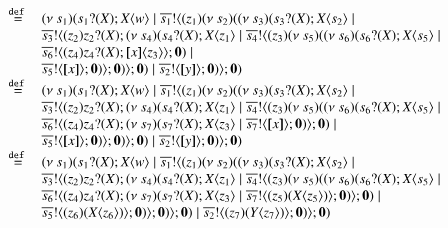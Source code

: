 \[\begin{array}{ll}
	\defeq&
	\newsp{s_1}{ \binp{s_1}{X} \appl{X}{w} \Par \bout{\dual{s_1}}{\abs{z_1}{\newsp{s_2}{\newsp{s_3}{ \binp{s_3}{X} \appl{X}{s_2} \Par \\
	& \bout{\dual{s_3}}{\abs{z_2}{\binp{z_2}{X} \newsp{s_4}{ \binp{s_4}{X} \appl{X}{z_1} \Par \bout{\dual{s_4}}{\abs{z_3}{\newsp{s_5}{ \newsp{s_6}{ \binp{s_6}{X} \appl{X}{s_5} \Par \\
	& \bout{\dual{s_6}}{\abs{z_4}{\binp{z_4}{X} \appl{\map{x}}{z_3}}} \inact} \Par\\
	&\bout{\dual{s_5}}{\map{x}} \inact }}} \inact}}} \inact} \Par \bout{\dual{s_2}}{\map{y}}\inact }}} \inact}\\
	\defeq &
	\newsp{s_1}{ \binp{s_1}{X} \appl{X}{w} \Par \bout{\dual{s_1}}{\abs{z_1}{\newsp{s_2}{\newsp{s_3}{ \binp{s_3}{X} \appl{X}{s_2} \Par \\
	& \bout{\dual{s_3}}{\abs{z_2}{\binp{z_2}{X} \newsp{s_4}{ \binp{s_4}{X} \appl{X}{z_1} \Par \bout{\dual{s_4}}{\abs{z_3}{\newsp{s_5}{ \newsp{s_6}{ \binp{s_6}{X} \appl{X}{s_5} \Par \\
	& \bout{\dual{s_6}}{\abs{z_4}{\binp{z_4}{X} \newsp{s_7}{ \binp{s_7}{X} \appl{X}{z_3} \Par \bout{\dual{s_7}}{\map{x}} \inact}}} \inact} \Par\\
	&\bout{\dual{s_5}}{\map{x}} \inact }}} \inact}}} \inact} \Par \bout{\dual{s_2}}{\map{y}}\inact }}} \inact}\\
	\defeq &
	\newsp{s_1}{ \binp{s_1}{X} \appl{X}{w} \Par \bout{\dual{s_1}}{\abs{z_1}{\newsp{s_2}{\newsp{s_3}{ \binp{s_3}{X} \appl{X}{s_2} \Par \\
	& \bout{\dual{s_3}}{\abs{z_2}{\binp{z_2}{X} \newsp{s_4}{ \binp{s_4}{X} \appl{X}{z_1} \Par \bout{\dual{s_4}}{\abs{z_3}{\newsp{s_5}{ \newsp{s_6}{ \binp{s_6}{X} \appl{X}{s_5} \Par \\
	& \bout{\dual{s_6}}{\abs{z_4}{\binp{z_4}{X} \newsp{s_7}{ \binp{s_7}{X} \appl{X}{z_3} \Par \bout{\dual{s_7}}{\abs{z_5} (\appl{X}{z_5})} \inact}}} \inact} \Par\\
	&\bout{\dual{s_5}}{\abs{z_6} (\appl{X}{z_6})} \inact }}} \inact}}} \inact} \Par \bout{\dual{s_2}}{\abs{z_7} (\appl{Y}{z_7})}\inact }}} \inact}\\
\end{array}
\]

